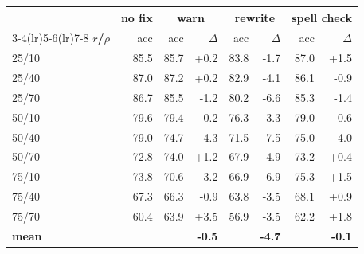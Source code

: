 \begin{tabular}{lr rr rr rr}
\toprule
& \textbf{no fix} & \multicolumn{2}{c}{\textbf{warn}} & \multicolumn{2}{c}{\textbf{rewrite}} & \multicolumn{2}{c}{\textbf{spell check}} \\
\cmidrule(lr){3-4}\cmidrule(lr){5-6}\cmidrule(lr){7-8}
\textbf{$r$/$\rho$} & acc & acc & $\Delta$ & acc & $\Delta$ & acc & $\Delta$ \\
\midrule
25/10 & 85.5 & 85.7 & +0.2 & 83.8 & -1.7 & 87.0 & +1.5 \\
25/40 & 87.0 & 87.2 & +0.2 & 82.9 & -4.1 & 86.1 & -0.9 \\
25/70 & 86.7 & 85.5 & -1.2 & 80.2 & -6.6 & 85.3 & -1.4 \\
50/10 & 79.6 & 79.4 & -0.2 & 76.3 & -3.3 & 79.0 & -0.6 \\
50/40 & 79.0 & 74.7 & -4.3 & 71.5 & -7.5 & 75.0 & -4.0 \\
50/70 & 72.8 & 74.0 & +1.2 & 67.9 & -4.9 & 73.2 & +0.4 \\
75/10 & 73.8 & 70.6 & -3.2 & 66.9 & -6.9 & 75.3 & +1.5 \\
75/40 & 67.3 & 66.3 & -0.9 & 63.8 & -3.5 & 68.1 & +0.9 \\
75/70 & 60.4 & 63.9 & +3.5 & 56.9 & -3.5 & 62.2 & +1.8 \\
\midrule \textbf{mean} & & & \textbf{-0.5} & & \textbf{-4.7} & & \textbf{-0.1} \\
\bottomrule
\end{tabular}